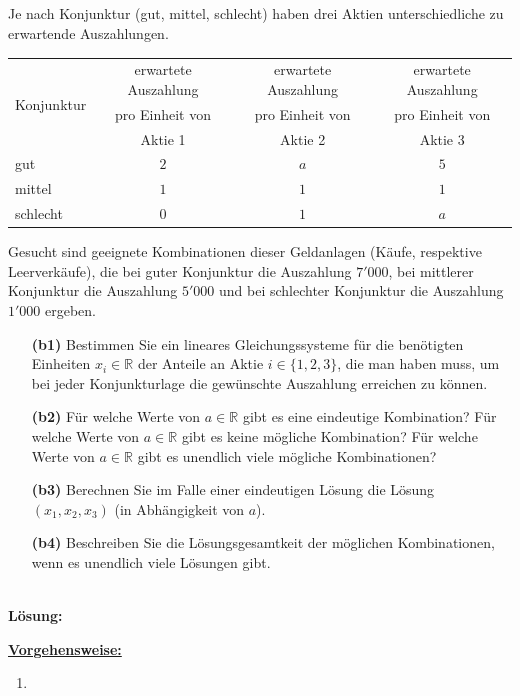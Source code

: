\subsection*{}
Je nach Konjunktur (gut, mittel, schlecht) haben drei Aktien unterschiedliche zu erwartende Auszahlungen.
\begin{table}[H]
	\centering
	\begin{tabular}{|l |c |c |c|}
		\hline
		\multirow{3}{*}{Konjunktur}
		& erwartete Auszahlung	& erwartete Auszahlung & erwartete Auszahlung\\
		& pro Einheit von & pro Einheit von & pro Einheit von\\
		& Aktie 1 & Aktie 2	& Aktie 3\\
		\hline
		gut & $ 2 $  &  $ a $ &  $ 5 $ \\ 
		\hline
		mittel & $ 1 $ & $ 1 $ & $ 1 $  \\ 
		\hline
		schlecht & $ 0 $ & $ 1 $ & $ a $ \\
		\hline
	\end{tabular}%
\end{table}
Gesucht sind geeignete Kombinationen dieser Geldanlagen (Käufe, respektive Leerverkäufe), die bei guter Konjunktur die Auszahlung $ 7'000 $, bei mittlerer Konjunktur die Auszahlung $ 5'000 $ und bei schlechter Konjunktur die Auszahlung $ 1'000 $ ergeben.
\begin{enumerate}
	\item[\textbf{(b1)}]
	Bestimmen Sie ein lineares Gleichungssysteme für die benötigten Einheiten $ x_i \in \mathbb{R} $ der Anteile an Aktie $ i \in \{1,2,3\} $, die man haben muss, um bei jeder Konjunkturlage die gewünschte Auszahlung erreichen zu können.
	\item[\textbf{(b2)}] 
	Für welche Werte von $ a \in \mathbb{R} $ gibt es eine eindeutige Kombination?
	Für welche Werte von $ a \in \mathbb{R} $ gibt es keine mögliche Kombination?
	Für welche Werte von $ a \in \mathbb{R} $ gibt es unendlich viele mögliche Kombinationen?
	\item[\textbf{(b3)}]
	Berechnen Sie im Falle einer eindeutigen Lösung die Lösung $ (x_1,x_2,x_3) $ (in Abhängigkeit von $ a $).
	\item[\textbf{(b4)}]
	Beschreiben Sie die Lösungsgesamtkeit der möglichen Kombinationen, wenn es unendlich viele Lösungen gibt.
\end{enumerate}
\ \\
\textbf{Lösung:}
\begin{mdframed}
\underline{\textbf{Vorgehensweise:}}
\renewcommand{\labelenumi}{\theenumi.}
\begin{enumerate}
\item 
\end{enumerate}
\end{mdframed}

